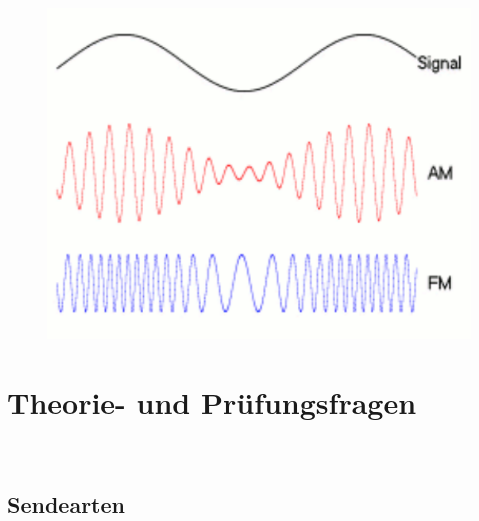 \begin{figure}
 \vspace{-6cm}
  \includegraphics[scale=0.6]{Modulation/Bilder/Amfm3-en-de.pdf}
 \vspace{-6cm}
\end{figure}

\section*{Theorie- und Prüfungsfragen}

~~~~~~

\subsection*{Sendearten}

